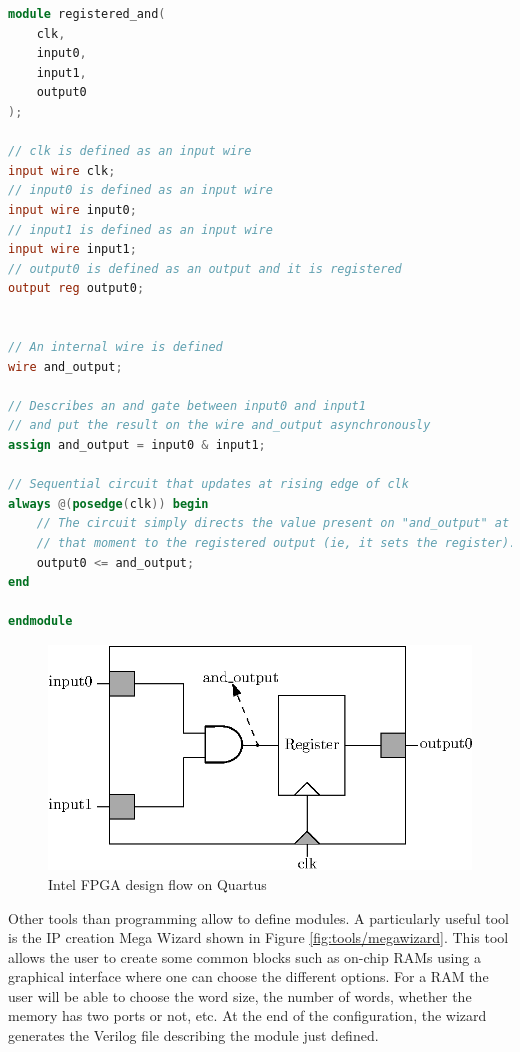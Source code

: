 \begin{lstlisting}[language=Verilog, caption=Verilog Registered AND gate example]
module registered_and(
    clk,
    input0,
    input1,
    output0
);

// clk is defined as an input wire 
input wire clk;   
// input0 is defined as an input wire  
input wire input0;  
// input1 is defined as an input wire
input wire input1; 
// output0 is defined as an output and it is registered
output reg output0; 


// An internal wire is defined
wire and_output;    

// Describes an and gate between input0 and input1
// and put the result on the wire and_output asynchronously
assign and_output = input0 & input1; 

// Sequential circuit that updates at rising edge of clk
always @(posedge(clk)) begin
    // The circuit simply directs the value present on "and_output" at 
    // that moment to the registered output (ie, it sets the register).
    output0 <= and_output;                      
end

endmodule

\end{lstlisting}

\begin{figure}[H]
    \centering
    \includegraphics[scale=1.0]{Chapter2-FPGA_Flow/res/register_and}
    \caption{Intel FPGA design flow on Quartus}
    \label{fig:verilog/register_and}
\end{figure}

Other tools than programming allow to define modules. A particularly useful tool is the IP creation 
Mega Wizard shown in Figure \ref{fig:tools/megawizard}. This tool allows the user to create some common 
blocks such as on-chip RAMs using a graphical interface where one can choose the different options. 
For a RAM the user will be able to choose the word size, the number of words, whether the memory has 
two ports or not, etc. At the end of the configuration, the wizard generates the Verilog file 
describing the module just defined.

